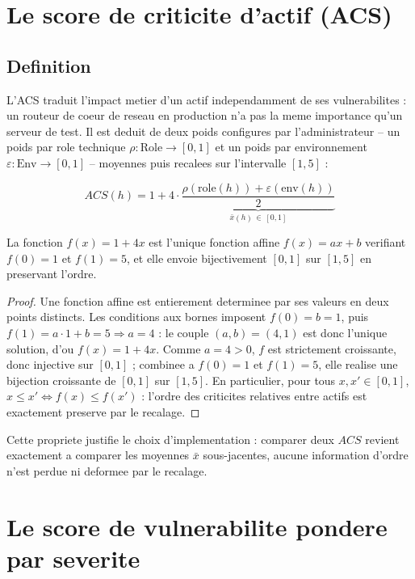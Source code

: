 \section{Le score de criticite d'actif (ACS)}

\subsection{Definition}

L'ACS traduit l'impact metier d'un actif independamment de ses vulnerabilites : un
routeur de coeur de reseau en production n'a pas la meme importance qu'un serveur de
test. Il est deduit de deux poids configures par l'administrateur -- un poids par
role technique $\rho: \mathrm{Role}\to[0,1]$ et un poids par environnement
$\varepsilon: \mathrm{Env}\to[0,1]$ -- moyennes puis recalees sur l'intervalle
$[1,5]$ :

\begin{equation}
ACS(h) = 1 + 4 \cdot \underbrace{\frac{\rho(\mathrm{role}(h)) + \varepsilon(\mathrm{env}(h))}{2}}_{\displaystyle \bar{x}(h)\,\in\,[0,1]}
\label{eq:acs}
\end{equation}

\begin{propriete}
\label{prop:acs-affine}
La fonction $f(x) = 1+4x$ est l'unique fonction affine $f(x)=ax+b$ verifiant
$f(0)=1$ et $f(1)=5$, et elle envoie bijectivement $[0,1]$ sur $[1,5]$ en preservant
l'ordre.
\end{propriete}

\begin{proof}
Une fonction affine est entierement determinee par ses valeurs en deux points
distincts. Les conditions aux bornes imposent $f(0)=b=1$, puis
$f(1)=a\cdot 1+b=5 \Rightarrow a=4$ : le couple $(a,b)=(4,1)$ est donc l'unique
solution, d'ou $f(x)=1+4x$. Comme $a=4>0$, $f$ est strictement croissante, donc
injective sur $[0,1]$ ; combinee a $f(0)=1$ et $f(1)=5$, elle realise une bijection
croissante de $[0,1]$ sur $[1,5]$. En particulier, pour tous $x,x'\in[0,1]$,
$x\le x' \iff f(x)\le f(x')$ : l'ordre des criticites relatives entre actifs est
exactement preserve par le recalage.
\end{proof}

Cette propriete justifie le choix d'implementation : comparer deux $ACS$ revient
exactement a comparer les moyennes $\bar x$ sous-jacentes, aucune information
d'ordre n'est perdue ni deformee par le recalage.

\section{Le score de vulnerabilite pondere par severite}

